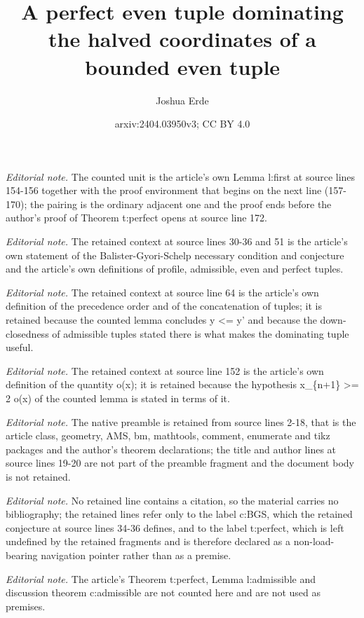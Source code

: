 \documentclass{article}
\title{A perfect even tuple dominating the halved coordinates of a bounded even tuple}
\author{Joshua Erde}
\date{arxiv:2404.03950v3; CC BY 4.0}
\begin{document}
\maketitle
\noindent\textit{Editorial note.} The counted unit is the article's own Lemma l:first at source lines 154-156 together with the proof environment that begins on the next line (157-170); the pairing is the ordinary adjacent one and the proof ends before the author's proof of Theorem t:perfect opens at source line 172.\par\medskip
\noindent\textit{Editorial note.} The retained context at source lines 30-36 and 51 is the article's own statement of the Balister-Gyori-Schelp necessary condition and conjecture and the article's own definitions of profile, admissible, even and perfect tuples.\par\medskip
\noindent\textit{Editorial note.} The retained context at source line 64 is the article's own definition of the precedence order and of the concatenation of tuples; it is retained because the counted lemma concludes y <= y' and because the down-closedness of admissible tuples stated there is what makes the dominating tuple useful.\par\medskip
\noindent\textit{Editorial note.} The retained context at source line 152 is the article's own definition of the quantity o(x); it is retained because the hypothesis x\_\{n+1\} >= 2 o(x) of the counted lemma is stated in terms of it.\par\medskip
\noindent\textit{Editorial note.} The native preamble is retained from source lines 2-18, that is the article class, geometry, AMS, bm, mathtools, comment, enumerate and tikz packages and the author's theorem declarations; the title and author lines at source lines 19-20 are not part of the preamble fragment and the document body is not retained.\par\medskip
\noindent\textit{Editorial note.} No retained line contains a citation, so the material carries no bibliography; the retained lines refer only to the label c:BGS, which the retained conjecture at source lines 34-36 defines, and to the label t:perfect, which is left undefined by the retained fragments and is therefore declared as a non-load-bearing navigation pointer rather than as a premise.\par\medskip
\noindent\textit{Editorial note.} The article's Theorem t:perfect, Lemma l:admissible and discussion theorem c:admissible are not counted here and are not used as premises.\par\medskip
\end{document}
